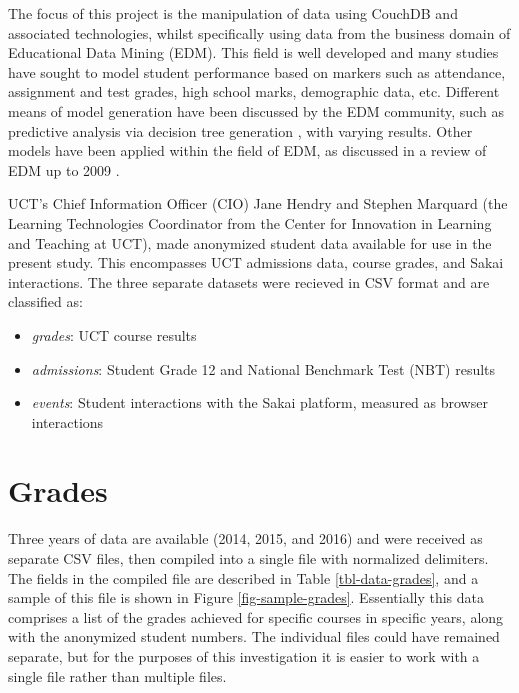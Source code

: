 The focus of this project is the manipulation of data using CouchDB and associated technologies, whilst specifically using data from the business domain of Educational Data Mining (EDM). This field is well developed and many studies have sought to model student performance based on markers such as attendance, assignment and test grades, high school marks, demographic data, etc. Different means of model generation have been discussed by the EDM community, such as predictive analysis via decision tree generation \cite{Qasem20016,Balestra2017,casper2017,Dimitris,zebun2005,Mierle:2005}, with varying results. Other models have been applied within the field of EDM, as discussed in a review of EDM up to 2009 \cite{bakerEdMiningSummary}.

UCT’s Chief Information Officer (CIO) Jane Hendry and Stephen Marquard (the Learning Technologies Coordinator from the Center for Innovation in Learning and Teaching at UCT), made anonymized student data available for use in the present study. This encompasses UCT admissions data, course grades, and Sakai interactions. The three separate datasets were recieved in CSV format and are classified as:

\begin{itemize}
    \item \textit{grades}: UCT course results
    \item \textit{admissions}: Student Grade 12 and National Benchmark Test (NBT) results
    \item \textit{events}: Student interactions with the Sakai platform, measured as browser interactions
\end{itemize}

\section{Grades}
Three years of data are available (2014, 2015, and 2016) and were received as separate CSV files, then compiled into a single file with normalized delimiters. The fields in the compiled file are described in Table \ref{tbl-data-grades}, and a sample of this file is shown in Figure \ref{fig-sample-grades}. Essentially this data comprises a list of the grades achieved for specific courses in specific years, along with the anonymized student numbers. The individual files could have remained separate, but for the purposes of this investigation it is easier to work with a single file rather than multiple files.




